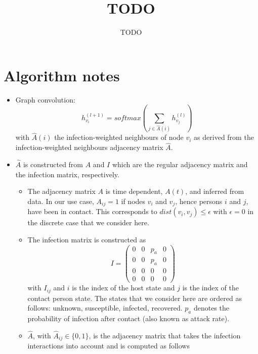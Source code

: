 \documentclass[]{article}
\title{TODO}
\author{TODO}
\begin{document}
\maketitle

\begin{abstract}

\end{abstract}

\section{Algorithm notes}

\begin{itemize}
	\item Graph convolution:
	\begin{equation}
		h_{v_i}^{(l+1)} = softmax(\sum_{j\in \hat{A}(i)} h_{v_j}^{(l)})
	\end{equation}
	with $\hat{A}(i)$ the infection-weighted neighbours of node $v_i$ as derived from the infection-weighted neighbours adjacency matrix $\hat{A}$.
	\item $\hat{A}$ is constructed from $A$ and $I$ which are the regular adjacency matrix and the infection matrix, respectively.
	\begin{itemize}
		\item The adjacency matrix $A$ is time dependent, $A(t)$, and inferred from data. In our use case, $A_{ij}=1$ if nodes $v_i$ and $v_j$, hence persons $i$ and $j$, have been in contact. This corresponds to $dist(v_i, v_j) \le \epsilon$ with $\epsilon=0$ in the discrete case that we consider here.
		\item The infection matrix is constructed as
		\begin{equation}
			I =
			\begin{pmatrix}
				0 & 0 & p_a & 0 \\
				0 & 0 & p_a & 0 \\
				0 & 0 &  0  & 0 \\
				0 & 0 &  0  & 0
			\end{pmatrix}
		\end{equation}
		with $I_{ij}$ and $i$ is the index of the host state and $j$ is the index of the contact person state. The states that we consider here are ordered as follows: unknown, susceptible, infected, recovered. $p_a$ denotes the probability of infection  after contact (also known as attack rate).
		\item $\hat{A}$, with $\hat{A}_{ij}\in \{0, 1\}$, is the adjacency matrix that takes the infection interactions into account and is computed as follows

\end{itemize}
\end{itemize}
\end{document}
